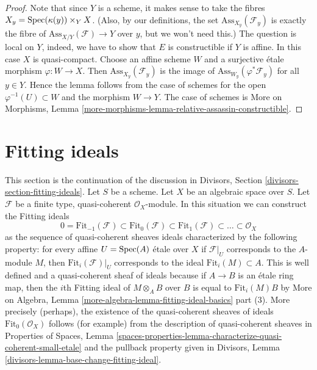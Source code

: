 \begin{proof}
Note that since $Y$ is a scheme, it makes sense to take the fibres
$X_y = \operatorname{Spec}(\kappa(y)) \times_Y X$. (Also, by our definitions, the
set $\text{Ass}_{X_y}(\mathcal{F}_y)$ is exactly the fibre of
$\text{Ass}_{X/Y}(\mathcal{F}) \to Y$ over $y$, but we won't need this.)
The question is local on $Y$, indeed, we have to show that
$E$ is constructible if $Y$ is affine.
In this case $X$ is quasi-compact. Choose an affine scheme $W$
and a surjective \'etale morphism $\varphi : W \to X$.
Then $\text{Ass}_{X_y}(\mathcal{F}_y)$ is the image of
$\text{Ass}_{W_y}(\varphi^*\mathcal{F}_y)$ for all $y \in Y$.
Hence the lemma follows from the case of schemes for
the open $\varphi^{-1}(U) \subset W$ and the morphism $W \to Y$.
The case of schemes is
More on Morphisms, Lemma
\ref{more-morphisms-lemma-relative-assassin-constructible}.
\end{proof}

\section{Fitting ideals}
\label{spaces-divisors-section-fitting-ideals}
This section is the continuation of the discussion in
Divisors, Section \ref{divisors-section-fitting-ideals}.
Let $S$ be a scheme. Let $X$ be an algebraic space over $S$.
Let $\mathcal{F}$ be a finite type, quasi-coherent $\mathcal{O}_X$-module.
In this situation we can construct the Fitting ideals
$$
0 = \text{Fit}_{-1}(\mathcal{F}) \subset \text{Fit}_0(\mathcal{F}) \subset
\text{Fit}_1(\mathcal{F}) \subset \ldots \subset \mathcal{O}_X
$$
as the sequence of quasi-coherent sheaves ideals characterized by the
following property: for every affine $U = \operatorname{Spec}(A)$ \'etale over $X$
if $\mathcal{F}|_U$ corresponds to the $A$-module $M$, then
$\text{Fit}_i(\mathcal{F})|_U$
corresponds to the ideal $\text{Fit}_i(M) \subset A$.
This is well defined and a quasi-coherent sheaf of ideals because
if $A \to B$ is an \'etale ring map, then the $i$th Fitting ideal
of $M \otimes_A B$ over $B$ is equal to $\text{Fit}_i(M) B$ by
More on Algebra, Lemma \ref{more-algebra-lemma-fitting-ideal-basics} part (3).
More precisely (perhaps), the existence of the quasi-coherent sheaves of ideals
$\text{Fit}_0(\mathcal{O}_X)$ follows (for example) from
the description of quasi-coherent sheaves in
Properties of Spaces, Lemma
\ref{spaces-properties-lemma-characterize-quasi-coherent-small-etale}
and the pullback property given in
Divisors, Lemma \ref{divisors-lemma-base-change-fitting-ideal}.

